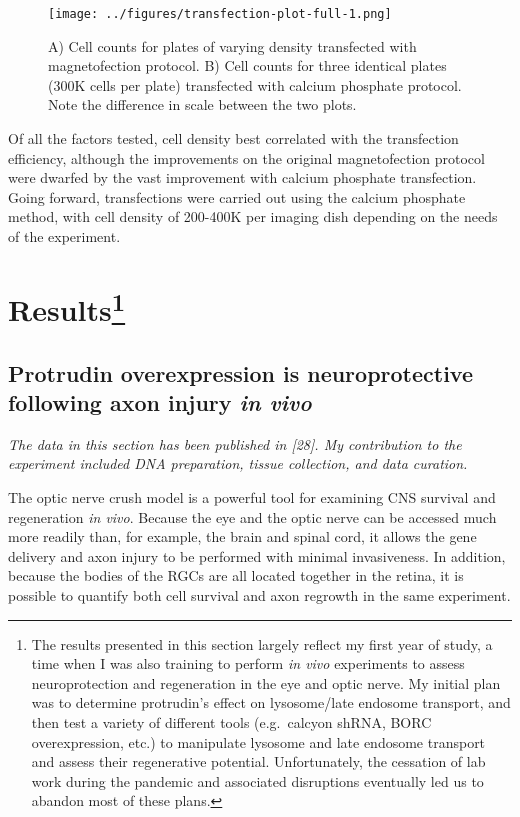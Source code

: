 \documentclass[
  12pt,
  a4paper,
]{book}
\begin{document}
\begin{figure}
\centering
\texttt{[image: ../figures/transfection-plot-full-1.png]}
\caption{\label{fig:transfection-plot-full}A) Cell counts for plates of varying density transfected with magnetofection protocol. B) Cell counts for three identical plates (300K cells per plate) transfected with calcium phosphate protocol. Note the difference in scale between the two plots.}
\end{figure}

Of all the factors tested, cell density best correlated with the transfection efficiency, although the improvements on the original magnetofection protocol were dwarfed by the vast improvement with calcium phosphate transfection. Going forward, transfections were carried out using the calcium phosphate method, with cell density of 200-400K per imaging dish depending on the needs of the experiment.

\hypertarget{results}{%
\section[Results]{\texorpdfstring{Results\footnote{The results presented in this section largely reflect my first year of study, a time when I was also training to perform \emph{in vivo} experiments to assess neuroprotection and regeneration in the eye and optic nerve. My initial plan was to determine protrudin's effect on lysosome/late endosome transport, and then test a variety of different tools (e.g.~calcyon shRNA, BORC overexpression, etc.) to manipulate lysosome and late endosome transport and assess their regenerative potential. Unfortunately, the cessation of lab work during the pandemic and associated disruptions eventually led us to abandon most of these plans.}}{Results}}\label{results}}

\hypertarget{protrudin-ONC}{%
\subsection{\texorpdfstring{Protrudin overexpression is neuroprotective following axon injury \emph{in vivo}}{Protrudin overexpression is neuroprotective following axon injury in vivo}}\label{protrudin-ONC}}

\emph{The data in this section has been published in {[}28{]}. My contribution to the experiment included DNA preparation, tissue collection, and data curation.}

The optic nerve crush model is a powerful tool for examining CNS survival and regeneration \emph{in vivo}. Because the eye and the optic nerve can be accessed much more readily than, for example, the brain and spinal cord, it allows the gene delivery and axon injury to be performed with minimal invasiveness. In addition, because the bodies of the RGCs are all located together in the retina, it is possible to quantify both cell survival and axon regrowth in the same experiment.
\end{document}
